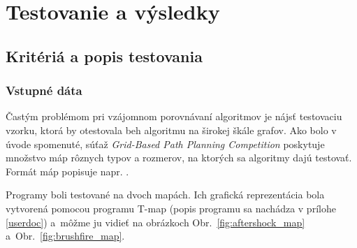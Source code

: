 \chapter{Testovanie a výsledky}

\section{Kritériá a popis testovania}
\subsection{Vstupné dáta}
Častým problémom pri vzájomnom porovnávaní algoritmov je
nájsť testovaciu vzorku, ktorá by otestovala beh algoritmu na širokej škále grafov.
Ako bolo v úvode spomenuté, súťaž {\sl Grid-Based Path Planning Competition} poskytuje množstvo máp rôznych typov a rozmerov,
na ktorých sa algoritmy dajú testovať. Formát máp popisuje napr. \cite{sturtevant2012benchmarks}.

Programy boli testované na dvoch mapách. Ich grafická reprezentácia bola 
vytvorená pomocou programu T-map (popis programu sa nachádza v prílohe \ref{userdoc}) 
a~môžme ju vidieť na obrázkoch Obr.~\ref{fig:aftershock_map} a~Obr.~\ref{fig:brushfire_map}.

